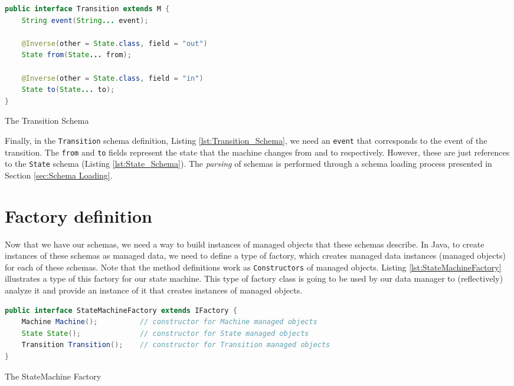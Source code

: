 \begin{sourcecode}[H]
	\begin{lstlisting}[language=Java,escapechar=|]
public interface Transition extends M {
	String event(String... event);

	@Inverse(other = State.class, field = "out")
	State from(State... from);

	@Inverse(other = State.class, field = "in")
	State to(State... to);
}
	\end{lstlisting}
	\caption{The Transition Schema}
	\label{lst:Transition_Schema}
\end{sourcecode}

Finally, in the \texttt{Transition} schema definition, Listing \ref{lst:Transition_Schema}, we need an \texttt{event} that corresponds to the event of the transition.
The \texttt{from} and \texttt{to} fields represent the state that the machine changes from and to respectively.
However, these are just references to the \texttt{State} schema (Listing \ref{lst:State_Schema}).
The \textit{parsing} of schemas is performed through a schema loading process presented in Section \ref{sec:Schema Loading}.

\section{Factory definition}
Now that we have our schemas, we need a way to build instances of managed objects that these schemas describe. 
In Java, to create instances of these schemas as managed data, we need to define a type of factory, which creates managed data instances (managed objects) for each of these schemas.
Note that the method definitions work as \texttt{Constructors} of managed objects.
Listing \ref{lst:StateMachineFactory} illustrates a type of this factory for our state machine.
This type of factory class is going to be used by our data manager to (reflectively) analyze it and provide an instance of it that creates instances of managed objects.

\begin{sourcecode}[H]
	\begin{lstlisting}[language=Java,escapechar=|]
public interface StateMachineFactory extends IFactory {
	Machine Machine();  		// constructor for Machine managed objects
	State State(); 				// constructor for State managed objects
	Transition Transition(); 	// constructor for Transition managed objects
}
	\end{lstlisting}
	\caption{The StateMachine Factory}
	\label{lst:StateMachineFactory}
\end{sourcecode}

